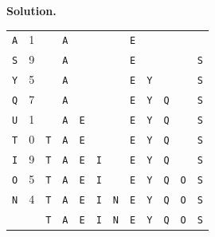 \documentclass[12pt, a4paper]{article}
\newenvironment{sol}[1][Solution]
{\par\medskip\noindent \textbf{#1.} }
{\medskip}
\begin{document}
\begin{sol}
\begin{center}
\begin{tabular}{cc|cccccccccc}
				\texttt{A} & 1 &
				{} & {\color{red}\texttt{A}} & {} & {} & {} & {\color{gray}\texttt{E}} & {} & {} & {} & {} \\
				
				\texttt{S} & 9 &
				{} & {\color{gray}\texttt{A}} & {} & {} & {} & {\color{gray}\texttt{E}} & {} & {} & {} & {\color{red}\texttt{S}}\\
				
				\texttt{Y} & 5 &
				{} & {\color{gray}\texttt{A}} & {} & {} & {} & {\color{black}\texttt{E}} & {\color{red}\texttt{Y}} & {} & {} & {\color{gray}\texttt{S}} \\
				
				\texttt{Q} & 7 &
				{} & {\color{gray}\texttt{A}} & {} & {} & {} & {\color{gray}\texttt{E}} & {\color{gray}\texttt{Y}} & {\color{red}\texttt{Q}} & {} & {\color{gray}\texttt{S}}\\
				
				\texttt{U} & 1 &
				{} & {\color{black}\texttt{A}} & {\color{red}\texttt{E}} & {} & {} & {\color{gray}\texttt{E}} & {\color{gray}\texttt{Y}} & {\color{gray}\texttt{Q}} & {} & {\color{gray}\texttt{S}} \\
				
				\texttt{T} & 0 &
				{\color{red}\texttt{T}} & {\color{gray}\texttt{A}} & {\color{gray}\texttt{E}} & {} & {} & {\color{gray}\texttt{E}} & {\color{gray}\texttt{Y}} & {\color{gray}\texttt{Q}} & {} & {\color{gray}\texttt{S}} \\
				
				\texttt{I} & 9 &
				{\color{black}\texttt{T}} & {\color{black}\texttt{A}} & {\color{black}\texttt{E}} & {\color{red}\texttt{I}} & {} & {\color{gray}\texttt{E}} & {\color{gray}\texttt{Y}} & {\color{gray}\texttt{Q}} & {} & {\color{black}\texttt{S}} \\
				
				\texttt{O} & 5 &
				{\color{gray}\texttt{T}} & {\color{gray}\texttt{A}} & {\color{gray}\texttt{E}} & {\color{gray}\texttt{I}} & {} & {\color{black}\texttt{E}} & {\color{black}\texttt{Y}} & {\color{black}\texttt{Q}} & {\color{red}\texttt{O}} & {\color{gray}\texttt{S}} \\
				
				\texttt{N} & 4 &
				{\color{gray}\texttt{T}} & {\color{gray}\texttt{A}} & {\color{gray}\texttt{E}} & {\color{gray}\texttt{I}} & {\color{red}\texttt{N}} & {\color{gray}\texttt{E}} & {\color{gray}\texttt{Y}} & {\color{gray}\texttt{Q}} & {\color{gray}\texttt{O}} & {\color{gray}\texttt{S}} \\
				
				{} & {} &
				{\color{black}\texttt{T}} & {\color{black}\texttt{A}} & {\color{black}\texttt{E}} & {\color{black}\texttt{I}} & {\color{black}\texttt{N}} & {\color{black}\texttt{E}} & {\color{black}\texttt{Y}} & {\color{black}\texttt{Q}} & {\color{black}\texttt{O}} & {\color{black}\texttt{S}} \\
			\end{tabular}
		\end{center}
	\end{sol}
\end{document}
